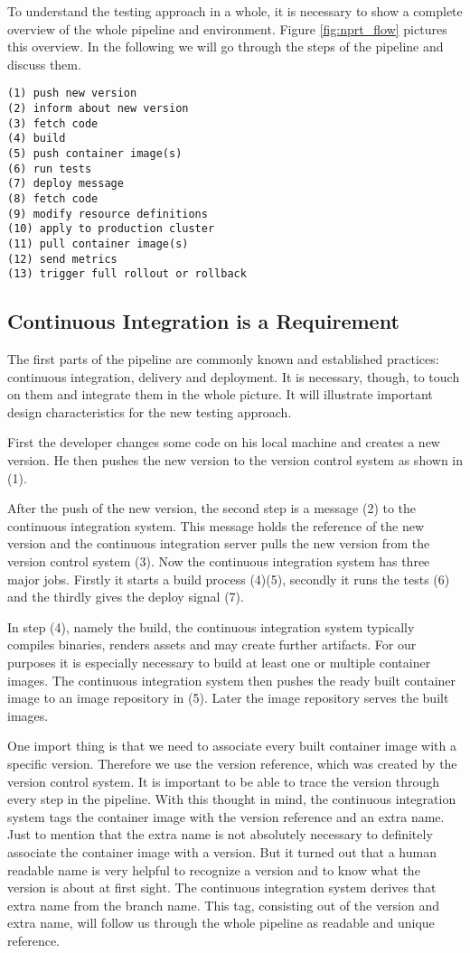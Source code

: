 To understand the testing approach in a whole, it is necessary to show a complete overview
of the whole pipeline and environment. Figure \ref{fig:nprt_flow} pictures this
overview. In the following we will go through the steps of the pipeline and discuss them.

\begin{verbatim}
(1) push new version
(2) inform about new version
(3) fetch code
(4) build
(5) push container image(s)
(6) run tests
(7) deploy message
(8) fetch code
(9) modify resource definitions
(10) apply to production cluster
(11) pull container image(s)
(12) send metrics
(13) trigger full rollout or rollback
\end{verbatim}

\subsection{Continuous Integration is a Requirement}

The first parts of the pipeline are commonly known and established practices: continuous
integration, delivery and deployment. It is necessary, though, to touch on them and
integrate them in the whole picture. It will illustrate important design characteristics
for the new testing approach.

First the developer changes some code on his local machine and creates a new version. He
then pushes the new version to the version control system as shown in (1).

After the push of the new version, the second step is a message (2) to the continuous
integration system. This message holds the reference of the new version and the continuous
integration server pulls the new version from the version control system (3). Now the
continuous integration system has three major jobs. Firstly it starts a build process
(4)(5), secondly it runs the tests (6) and the thirdly gives the deploy signal (7).

In step (4), namely the build, the continuous integration system typically compiles
binaries, renders assets and may create further artifacts. For our purposes it is
especially necessary to build at least one or multiple container images. The continuous
integration system then pushes the ready built container image to an image repository in
(5). Later the image repository serves the built images.

One import thing is that we need to associate every built container image with a specific
version. Therefore we use the version reference, which was created by the version control
system. It is important to be able to trace the version through every step in the
pipeline. With this thought in mind, the continuous integration system tags the container
image with the version reference and an extra name. Just to mention that the extra name is
not absolutely necessary to definitely associate the container image with a version. But
it turned out that a human readable name is very helpful to recognize a version and to
know what the version is about at first sight. The continuous integration system derives
that extra name from the branch name. This tag, consisting out of the version and extra
name, will follow us through the whole pipeline as readable and unique reference.

